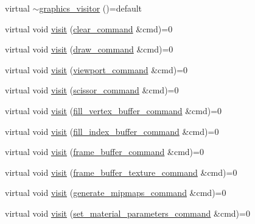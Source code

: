 \begin{DoxyCompactItemize}
\item 
virtual \mbox{\hyperlink{classmoka_1_1graphics__visitor_abb4149b5b2b3427d717f502ac6f0d62a}{$\sim$graphics\+\_\+visitor}} ()=default
\item 
virtual void \mbox{\hyperlink{classmoka_1_1graphics__visitor_a23fe107787a01cf0ceb2e20d339d4493}{visit}} (\mbox{\hyperlink{classmoka_1_1clear__command}{clear\+\_\+command}} \&cmd)=0
\item 
virtual void \mbox{\hyperlink{classmoka_1_1graphics__visitor_a706120c8d7ec9a21f347f06ff56ad8c9}{visit}} (\mbox{\hyperlink{classmoka_1_1draw__command}{draw\+\_\+command}} \&cmd)=0
\item 
virtual void \mbox{\hyperlink{classmoka_1_1graphics__visitor_a1808e0ed3533d53505bb15d559a7b3f7}{visit}} (\mbox{\hyperlink{classmoka_1_1viewport__command}{viewport\+\_\+command}} \&cmd)=0
\item 
virtual void \mbox{\hyperlink{classmoka_1_1graphics__visitor_acba017a4df89e43b253cb99845be729b}{visit}} (\mbox{\hyperlink{classmoka_1_1scissor__command}{scissor\+\_\+command}} \&cmd)=0
\item 
virtual void \mbox{\hyperlink{classmoka_1_1graphics__visitor_acb45af562db73ae20f1566246f1dec00}{visit}} (\mbox{\hyperlink{classmoka_1_1fill__vertex__buffer__command}{fill\+\_\+vertex\+\_\+buffer\+\_\+command}} \&cmd)=0
\item 
virtual void \mbox{\hyperlink{classmoka_1_1graphics__visitor_ab04b60a937648b132c43a6c8b0e7bd64}{visit}} (\mbox{\hyperlink{classmoka_1_1fill__index__buffer__command}{fill\+\_\+index\+\_\+buffer\+\_\+command}} \&cmd)=0
\item 
virtual void \mbox{\hyperlink{classmoka_1_1graphics__visitor_a3e9f360d22b60c1b4ee3f9fd57df2447}{visit}} (\mbox{\hyperlink{classmoka_1_1frame__buffer__command}{frame\+\_\+buffer\+\_\+command}} \&cmd)=0
\item 
virtual void \mbox{\hyperlink{classmoka_1_1graphics__visitor_a38cb82e793a045d26e0664fdd7fa66d4}{visit}} (\mbox{\hyperlink{classmoka_1_1frame__buffer__texture__command}{frame\+\_\+buffer\+\_\+texture\+\_\+command}} \&cmd)=0
\item 
virtual void \mbox{\hyperlink{classmoka_1_1graphics__visitor_a008fb998e951132faef8af59e28d1ebf}{visit}} (\mbox{\hyperlink{classmoka_1_1generate__mipmaps__command}{generate\+\_\+mipmaps\+\_\+command}} \&cmd)=0
\item 
virtual void \mbox{\hyperlink{classmoka_1_1graphics__visitor_aa197ab3921b6fb35cbe2524e6dfef54a}{visit}} (\mbox{\hyperlink{classmoka_1_1set__material__parameters__command}{set\+\_\+material\+\_\+parameters\+\_\+command}} \&cmd)=0
\end{DoxyCompactItemize}


